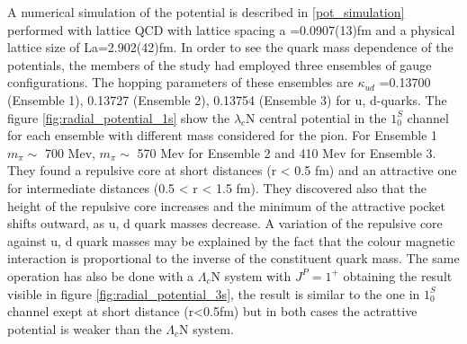 \documentclass[12pt,a4paper]{book}
\begin{document}
	
	A numerical simulation of the potential is described in \ref{pot_simulation} performed with lattice QCD with lattice spacing a =0.0907(13)fm and a physical lattice size of La=2.902(42)fm. In order to see the quark mass dependence of the potentials, the members of the study had employed three ensembles of gauge configurations. The hopping parameters of these ensembles are $\kappa_{ud}$ =0.13700 (Ensemble 1), 0.13727 (Ensemble 2), 0.13754 (Ensemble 3) for u, d-quarks. The figure \ref{fig:radial_potential_1s} show the $\lambda_c$N central potential in the $1^S_0$ channel for each ensemble with different mass considered for the pion. For Ensemble 1 $m_\pi \sim$ 700 Mev, $m_\pi \sim$ 570 Mev for Ensemble 2 and 410 Mev for Ensemble 3. They found a repulsive core at short distances (r < 0.5 fm) and an attractive one for intermediate distances (0.5 < r < 1.5 fm). They discovered also that the height of the repulsive core increases and the minimum of the attractive pocket shifts outward, as u, d quark masses decrease. A variation of the repulsive core against u, d quark masses may be explained by the fact that the colour magnetic interaction is proportional to the inverse of the constituent quark mass. The same operation has also be done with a $\Lambda_c$N system with $J^P=1^+$ obtaining the result visible in figure \ref{fig:radial_potential_3s}, 
	the result is similar to the one in $1^S_0$ channel exept at short distance (r<0.5fm) but in both cases the actrattive potential is weaker than the $\Lambda_c$N system.
	
\end{document}
